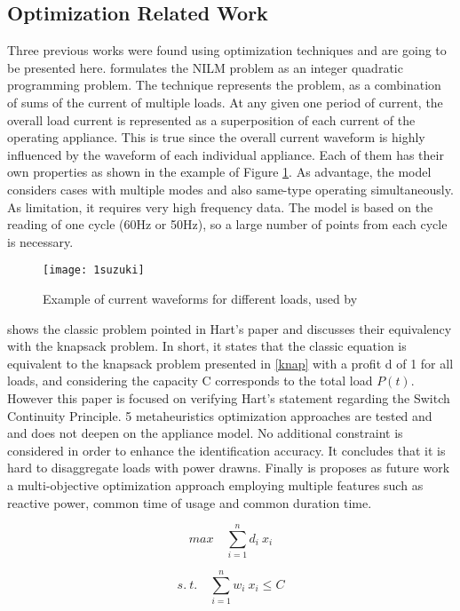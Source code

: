 \subsection{Optimization Related Work}
Three previous works were found using optimization techniques and are going to be presented here. \cite{suzuki} formulates the NILM problem as an integer quadratic programming problem. The technique represents the problem, as a combination of sums of the current of multiple loads. 
At any given one period of current, the overall load current is represented as a superposition of each current of the operating appliance. This is true since the overall current waveform is highly influenced by the waveform of each individual appliance. Each of them has their own properties as shown in the example of Figure \ref{1suzuki}. As advantage, the model considers cases with multiple modes and also same-type operating simultaneously. As limitation, it requires very high frequency data. The model is based on the reading of one cycle (60Hz or 50Hz), so a large number of points from each cycle is necessary.


\begin{figure}
    \centering
    \texttt{[image: 1suzuki]}
    \caption{Example of current waveforms for different loads, used by \cite{suzuki}}
    \label{1suzuki}
\end{figure}


\cite{meta} shows the classic problem pointed in Hart's paper and discusses their equivalency with the knapsack problem. In short, it states that the classic equation is equivalent to the knapsack problem presented in \ref{knap} with a profit d of 1 for all loads, and considering the capacity C corresponds to the total load $P(t)$. However this paper is focused on verifying Hart’s statement regarding the Switch Continuity Principle. 5 metaheuristics optimization approaches are tested and  and does not deepen on the appliance model. No additional constraint is considered in order to enhance the identification accuracy. It concludes that it is hard to disaggregate loads with power drawns.
Finally is proposes as future work a multi-objective optimization approach employing multiple features such as reactive power, common time of usage and common duration time.

\begin{equation} \label{knap}
   max \quad \sum_{i=1}^{n} d_i \ x_i
\end{equation}

$$ s. \ t. \quad \sum_{i=1}^{n} w_i \ x_i \leq C $$

